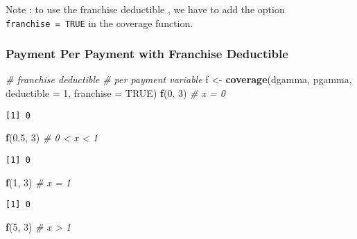 \documentclass[]{book}
\newenvironment{Shaded}{\begin{snugshade}}{\end{snugshade}}
\newcommand{\KeywordTok}[1]{\textcolor[rgb]{0.13,0.29,0.53}{\textbf{#1}}}
\newcommand{\DataTypeTok}[1]{\textcolor[rgb]{0.13,0.29,0.53}{#1}}
\newcommand{\DecValTok}[1]{\textcolor[rgb]{0.00,0.00,0.81}{#1}}
\newcommand{\FloatTok}[1]{\textcolor[rgb]{0.00,0.00,0.81}{#1}}
\newcommand{\StringTok}[1]{\textcolor[rgb]{0.31,0.60,0.02}{#1}}
\newcommand{\CommentTok}[1]{\textcolor[rgb]{0.56,0.35,0.01}{\textit{#1}}}
\newcommand{\OtherTok}[1]{\textcolor[rgb]{0.56,0.35,0.01}{#1}}
\newcommand{\NormalTok}[1]{#1}
\theoremstyle{definition}
\theoremstyle{definition}
\theoremstyle{definition}
\theoremstyle{remark}
\begin{document}
Note : to use the franchise deductible , we have to add the option
\texttt{franchise\ =\ TRUE} in the coverage function.

\subsubsection{Payment Per Payment with Franchise
Deductible}\label{payment-per-payment-with-franchise-deductible}

\begin{Shaded}
\begin{Highlighting}[]
\CommentTok{# franchise deductible}
\CommentTok{# per payment variable}
\NormalTok{f <-}\StringTok{ }\KeywordTok{coverage}\NormalTok{(dgamma, pgamma, }\DataTypeTok{deductible =} \DecValTok{1}\NormalTok{, }\DataTypeTok{franchise =} \OtherTok{TRUE}\NormalTok{)}
\KeywordTok{f}\NormalTok{(}\DecValTok{0}\NormalTok{, }\DecValTok{3}\NormalTok{)   }\CommentTok{# x = 0}
\end{Highlighting}
\end{Shaded}

\begin{verbatim}
[1] 0
\end{verbatim}

\begin{Shaded}
\begin{Highlighting}[]
\KeywordTok{f}\NormalTok{(}\FloatTok{0.5}\NormalTok{, }\DecValTok{3}\NormalTok{) }\CommentTok{# 0 < x < 1}
\end{Highlighting}
\end{Shaded}

\begin{verbatim}
[1] 0
\end{verbatim}

\begin{Shaded}
\begin{Highlighting}[]
\KeywordTok{f}\NormalTok{(}\DecValTok{1}\NormalTok{, }\DecValTok{3}\NormalTok{) }\CommentTok{# x = 1}
\end{Highlighting}
\end{Shaded}

\begin{verbatim}
[1] 0
\end{verbatim}

\begin{Shaded}
\begin{Highlighting}[]
\KeywordTok{f}\NormalTok{(}\DecValTok{5}\NormalTok{, }\DecValTok{3}\NormalTok{) }\CommentTok{# x > 1}
\end{Highlighting}
\end{Shaded}
\end{document}
